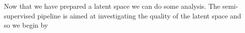 \noindent Now that we have prepared a latent space we can do some analysis. The semi-supervised pipeline is aimed at investigating the quality of the  latent space and so we begin by 

\begin{minipage}{\linewidth}
\begin{lstlisting}[language=iPython]

\end{lstlisting}

\end{minipage}


